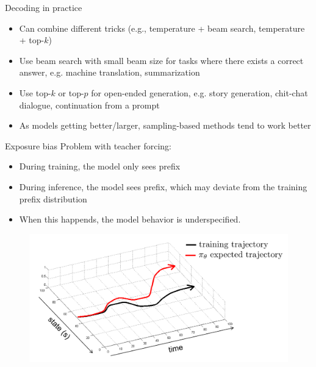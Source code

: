 \documentclass[usenames,dvipsnames,notes,11pt,aspectratio=169,hyperref={colorlinks=true, linkcolor=blue}]{beamer}
\begin{document}
\begin{frame}
    {Decoding in practice}
    \begin{itemize}
        \itemsep1em
        \item Can combine different tricks (e.g., temperature + beam search, temperature + top-$k$)
        \item Use beam search with small beam size for tasks where there exists a correct answer, e.g. machine translation, summarization
        \item Use top-$k$ or top-$p$ for open-ended generation, e.g. story generation, chit-chat dialogue, continuation from a prompt
        \item As models getting better/larger, sampling-based methods tend to work better
    \end{itemize}
\end{frame}

\begin{frame}
    {Exposure bias}
    Problem with teacher forcing:\\
    \begin{itemize}
        \item During training, the model only sees  prefix
        \item During inference, the model sees  prefix, which may deviate from the training prefix distribution
        \item When this happends, the model behavior is underspecified.
    \end{itemize}

    \begin{figure}
        \includegraphics[height=0.5\textheight]{figures/exposure}
    \end{figure}
\end{frame}
\end{document}
